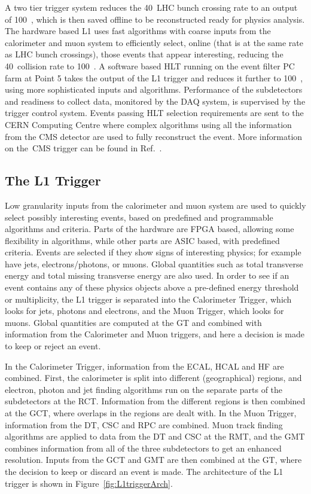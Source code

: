 A two tier trigger system reduces the 40~\MHz \ac{LHC} bunch crossing rate to an output of 100~\Hz, which is then saved offline to be reconstructed ready for physics analysis. 
The hardware based \ac{L1} uses fast algorithms with coarse inputs from the calorimeter and muon system to efficiently select, online (that is at the same rate as \ac{LHC} bunch crossings),
 those events that appear interesting, reducing the 40~\MHz collision rate to 100~\kHz.
A software based \ac{HLT} running on the event filter PC farm at Point 5 takes the output of the \ac{L1} trigger and reduces it further to 100~\Hz, using more sophisticated inputs and algorithms.
Performance of the subdetectors and readiness to collect data, monitored by the \ac{DAQ} system, is supervised by the trigger control system.
Events passing \ac{HLT} selection requirements are sent to the \ac{CERN} Computing Centre where complex algorithms using all the information from the \ac{CMS} detector are used to fully reconstruct the event.
More information on the~\ac{CMS} trigger can be found in Ref.~\cite{Cittolin:578006}.

\subsection{The L1 Trigger}
Low granularity inputs from the calorimeter and muon system are used to quickly select possibly interesting events, based on predefined and programmable algorithms and criteria.
Parts of the hardware are \ac{FPGA} based, allowing some flexibility in algorithms, while other parts are \ac{ASIC} based, with predefined criteria.
Events are selected if they show signs of interesting physics; for example have jets, electrons/photons, or muons. 
Global quantities such as total transverse energy and total missing transverse energy are also used.  
In order to see if an event contains any of these physics objects above a pre-defined energy threshold or multiplicity, 
the L1 trigger is separated into the Calorimeter Trigger, which looks for jets, photons and electrons, and the Muon Trigger, which looks for muons. 
Global quantities are computed at the \ac{GT} and combined with information from the Calorimeter and Muon triggers, 
and here a decision is made to keep or reject an event.

In the Calorimeter Trigger, information from the \ac{ECAL}, \ac{HCAL} and \ac{HF} are combined.
First, the calorimeter is split into different (geographical) regions, and electron, photon and jet finding algorithms run on the separate parts of the subdetectors at the \ac{RCT}.
Information from the different regions is then combined at the \ac{GCT}, where overlaps in the regions are dealt with.
In the Muon Trigger, information from the \ac{DT}, \ac{CSC} and \ac{RPC} are combined.  
Muon track finding algorithms are applied to data from the \ac{DT} and \ac{CSC} at the \ac{RMT},
and the \ac{GMT} combines information from all of the three subdetectors to get an enhanced resolution.
Inputs from the \ac{GCT} and \ac{GMT} are then combined at the \ac{GT}, 
where the decision to keep or discard an event is made.
The architecture of the L1 trigger is shown in Figure~\ref{fig:L1triggerArch}.

